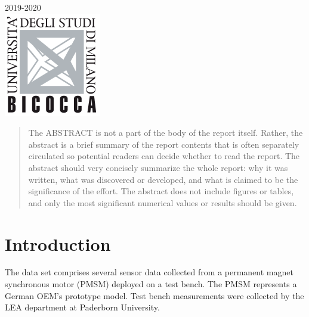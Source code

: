 \begin{titlepage}
{\large 2019-2020}\\[1cm] %


\includegraphics{imgs/logo.png}\\[1cm] %
 

\vfill %

\end{titlepage}


\begin{abstract}
The ABSTRACT is not a part of the body of the report itself. Rather, the abstract is a brief summary of the report contents that is often separately circulated so potential readers can decide whether to read the report. The abstract should very concisely summarize the whole report: why it was written, what was discovered or developed, and what is claimed to be the significance of the effort. The abstract does not include figures or tables, and only the most significant numerical values or results should be given.
\end{abstract}

\section{Introduction}
The data set comprises several sensor data collected from a permanent magnet synchronous motor (PMSM) deployed on a test bench. 
The PMSM represents a German OEM's prototype model. 
Test bench measurements were collected by the LEA department at Paderborn University.

